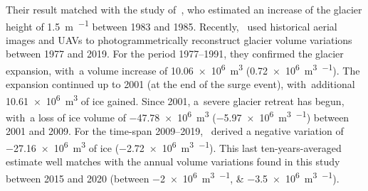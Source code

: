 Their result matched with the study of~\cite{Roethlisberger1985}, who estimated an
increase of the glacier height of \SI[retain-explicit-plus]{+1.5}{\m\per\year} between
1983 and 1985.
Recently,~\cite{Degaetani2021} used historical aerial images and UAVs to
photogrammetrically reconstruct glacier volume variations between 1977 and 2019.
For the period 1977--1991, they confirmed the glacier expansion, with~a volume
increase of \SI[retain-explicit-plus]{+10.06e6}{\cubic\meter}
(\SI[retain-explicit-plus]{+0.72e6}{\cubic\m\per\year}).
The expansion continued up to 2001 (at the end of the surge event), with~additional
\SI{10.61e6}{\cubic\m} of ice gained.
Since 2001, a~severe glacier retreat has begun, with~a loss of ice volume of
\SI{-47.78e6}{\cubic\meter} (\SI{-5.97e6}{\cubic\meter\per\year}) between 2001 and 2009.
For the time-span 2009--2019,~\citep{Degaetani2021} derived a negative variation of
\SI{-27.16e6}{\cubic\m} of ice (\SI{-2.72e6}{\cubic\meter\per\year}).
This last ten-years-averaged estimate well matches with the annual volume variations
found in this study between 2015 and 2020 (between
\SIlist{-2e6;-3.5e6}{\cubic\meter\per\year}).

\makechapterbibliography{}

